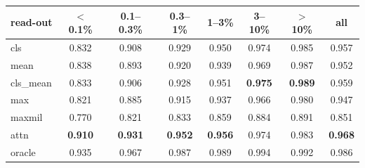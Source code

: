 \begin{tabular}{lccccccc}
\toprule
read-out & $<$0.1\% & 0.1--0.3\% & 0.3--1\% & 1--3\% & 3--10\% & $>$10\% & all \\
\midrule
cls & 0.832 & 0.908 & 0.929 & 0.950 & 0.974 & 0.985 & 0.957 \\
mean & 0.838 & 0.893 & 0.920 & 0.939 & 0.969 & 0.987 & 0.952 \\
cls\_mean & 0.833 & 0.906 & 0.928 & 0.951 & \textbf{0.975} & \textbf{0.989} & 0.959 \\
max & 0.821 & 0.885 & 0.915 & 0.937 & 0.966 & 0.980 & 0.947 \\
maxmil & 0.770 & 0.821 & 0.833 & 0.859 & 0.884 & 0.891 & 0.851 \\
attn & \textbf{0.910} & \textbf{0.931} & \textbf{0.952} & \textbf{0.956} & 0.974 & 0.983 & \textbf{0.968} \\
\midrule
oracle & 0.935 & 0.967 & 0.987 & 0.989 & 0.994 & 0.992 & 0.986 \\
\bottomrule
\end{tabular}
